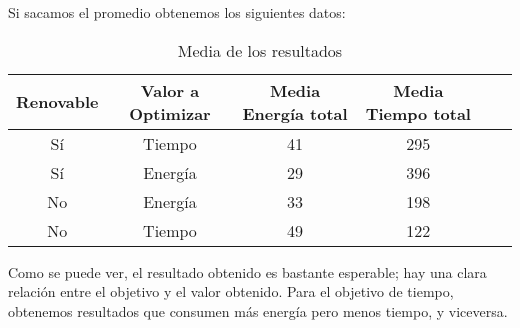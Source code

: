 \documentclass{article}
\begin{document}
    Si sacamos el promedio obtenemos los siguientes datos:
    \begin{table}[h!]
        \centering
        \caption{Media de los resultados}
        \label{tab:data}
        \begin{tabular}{cccccc}
        \hline
        \textbf{Renovable} & \textbf{Valor a Optimizar} & \textbf{Media Energía total} & \textbf{Media Tiempo total} \\
        \hline
        Sí & Tiempo & 41 & 295 \\
        Sí & Energía & 29 & 396 \\
        No & Energía & 33 & 198 \\
        No & Tiempo & 49 & 122 \\
        \hline
        \end{tabular}
        
        \label{tabla:media}
        \end{table}

        Como se puede ver, el resultado obtenido es bastante esperable; hay una clara relación entre el objetivo y el valor obtenido. Para el objetivo de tiempo, obtenemos resultados que consumen más energía pero menos tiempo, y viceversa.
\end{document}
